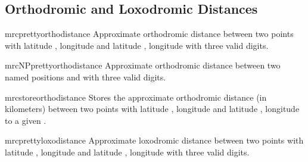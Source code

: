 \subsection{Orthodromic and Loxodromic Distances}

\begin{docCommand}{mrcprettyorthodistance}{}
  Approximate orthodromic distance between two points
  with latitude , longitude 
  and latitude , longitude 
  with three valid digits.
  \begin{dispExample}
  \end{dispExample}
\end{docCommand}


\begin{docCommand}{mrcNPprettyorthodistance}{}
  Approximate orthodromic distance between two named positions
   and  with three valid digits.
  \begin{dispExample}
  \end{dispExample}
\end{docCommand}


\begin{docCommand}{mrcstoreorthodistance}{}
  Stores the approximate orthodromic distance (in kilometers) between two points
  with latitude , longitude 
  and latitude , longitude 
  to a given .
  \begin{dispExample}
  \mrcstoreorthodistance{}
  \mydist
  \end{dispExample}
\end{docCommand}


\begin{docCommand}{mrcprettyloxodistance}{}
  Approximate loxodromic distance between two points
  with latitude , longitude 
  and latitude , longitude 
  with three valid digits.
  \begin{dispExample}
  \end{dispExample}
\end{docCommand}


